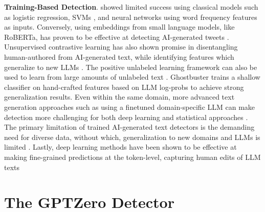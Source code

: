 \documentclass[11pt]{article}
\newcommand{\lee}[1]{{\color{purple}{DL: #1}}}
\newcommand{\gptzero}{GPTZero}
\begin{document}
{\bf Training-Based Detection}.
\cite{Islam2023-uj} showed limited success using classical models such as logistic regression, SVMs \cite{Hearst1998-ty}, and neural networks \cite{Hochreiter1997-gp} using word frequency features as inputs. 
Conversely, using embeddings from small language models, like RoBERTa, has proven to be effective at detecting AI-generated tweets \cite{Kumarage2023-db}. 
Unsupervised contrastive learning has also shown promise in disentangling human-authored from AI-generated text, while identifying features which generalize to new LLMs \cite{Bhattacharjee2023-yv, Zhang2024-di}. The positive unlabeled learning framework can also be used to learn from large amounts of unlabeled text \cite{Tian2023-ui}.
Ghostbuster \cite{Verma2023-ti} trains a shallow classifier on hand-crafted features based on LLM log-probs to achieve strong generalization results. 
Even within the same domain, more advanced text generation approaches such as using a finetuned domain-specific LLM can make detection more challenging for both deep learning and statistical approaches \cite{Dawkins2025-cg}.
The primary limitation of trained AI-generated text detectors is the demanding need for diverse data, without which, generalization to new domains and LLMs is limited \cite{Dugan2024-qu}.
Lastly, deep learning methods have been shown to be effective at making fine-grained predictions at the token-level, capturing human edits of LLM texts \cite{Kadiyala2025-kc, Artemova2024-jh, Pham2025-fe}


\section{The \gptzero{} Detector}

\end{document}
